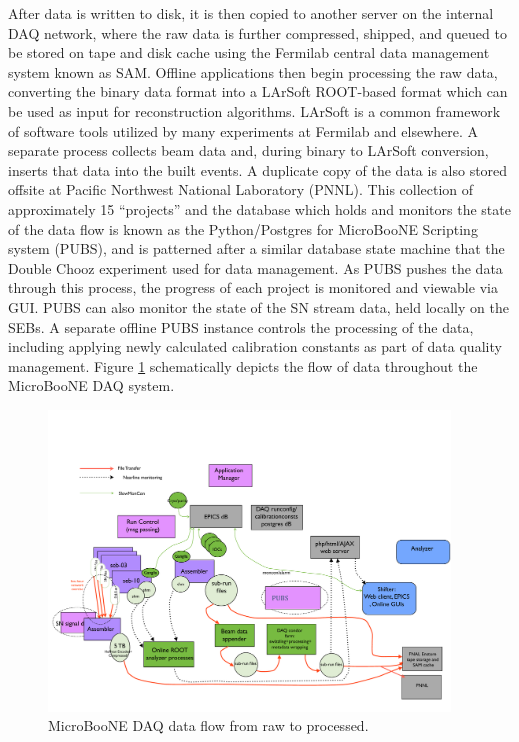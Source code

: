 After data is written to disk, it is then copied to another server on the internal DAQ network, where the raw data is further compressed, shipped, and queued to be stored on tape and disk cache using the Fermilab central data management system known as SAM.  Offline applications then begin processing the raw data, converting the binary data format into a LArSoft \cite{larsoft} ROOT-based format which can be used as input for reconstruction algorithms.  LArSoft is a common framework of software tools utilized by many \lartpc experiments at Fermilab and elsewhere.  A separate process collects beam data and, during binary to LArSoft conversion, inserts that data into the built events. A duplicate copy of the data is also stored offsite at Pacific Northwest National Laboratory (PNNL). This collection of approximately 15 ``projects''  and the database which holds and monitors the state of the data flow is known as the Python/Postgres for MicroBooNE Scripting system (PUBS), and is patterned after a similar database state machine that the Double Chooz experiment used for data management.  As PUBS pushes the data through this process, the progress of each project is monitored and viewable via GUI. PUBS can also monitor the state of the SN stream data, held locally on the SEBs.  A separate offline PUBS instance controls the processing of the data, including applying newly calculated calibration constants as part of data quality management.  Figure \ref{fig:dataflow} schematically depicts the flow of data throughout the MicroBooNE DAQ system.

\begin{figure}
\centering
\includegraphics[width=0.95\textwidth]{./figures/dataFlow.pdf}
\caption{MicroBooNE DAQ data flow from raw to processed.}
\label{fig:dataflow}
\end{figure}


